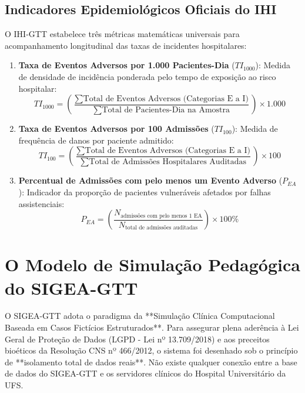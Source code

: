 \subsection{Indicadores Epidemiológicos Oficiais do IHI}
O IHI-GTT estabelece três métricas matemáticas universais para acompanhamento longitudinal das taxas de incidentes hospitalares:
\begin{enumerate}
    \item \textbf{Taxa de Eventos Adversos por 1.000 Pacientes-Dia} ($TI_{1000}$): Medida de densidade de incidência ponderada pelo tempo de exposição ao risco hospitalar:
    \begin{equation}
        TI_{1000} = \left( \frac{\sum \text{Total de Eventos Adversos (Categorias E a I)}}{\sum \text{Total de Pacientes-Dia na Amostra}} \right) \times 1.000
        \label{eq_ti1000}
    \end{equation}
    
    \item \textbf{Taxa de Eventos Adversos por 100 Admissões} ($TI_{100}$): Medida de frequência de danos por paciente admitido:
    \begin{equation}
        TI_{100} = \left( \frac{\sum \text{Total de Eventos Adversos (Categorias E a I)}}{\sum \text{Total de Admissões Hospitalares Auditadas}} \right) \times 100
        \label{eq_ti100}
    \end{equation}
    
    \item \textbf{Percentual de Admissões com pelo menos um Evento Adverso} ($P_{EA}$): Indicador da proporção de pacientes vulneráveis afetados por falhas assistenciais:
    \begin{equation}
        P_{EA} = \left( \frac{N_{\text{admissões com pelo menos 1 EA}}}{N_{\text{total de admissões auditadas}}} \right) \times 100\%
        \label{eq_pea}
    \end{equation}
\end{enumerate}

\section{O Modelo de Simulação Pedagógica do SIGEA-GTT}
\label{sec_modelo_simulacao}

O SIGEA-GTT adota o paradigma da **Simulação Clínica Computacional Baseada em Casos Fictícios Estruturados**. Para assegurar plena aderência à Lei Geral de Proteção de Dados (LGPD - Lei nº 13.709/2018) e aos preceitos bioéticos da Resolução CNS nº 466/2012, o sistema foi desenhado sob o princípio de **isolamento total de dados reais**. Não existe qualquer conexão entre a base de dados do SIGEA-GTT e os servidores clínicos do Hospital Universitário da UFS.

